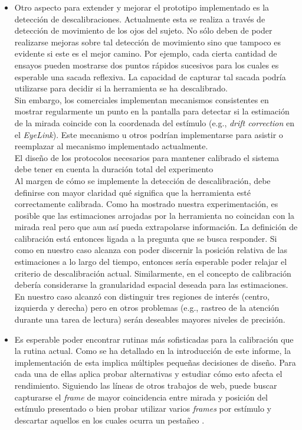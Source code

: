 \begin{itemize}
  \item Otro aspecto para extender y mejorar el prototipo implementado es la
detección de descalibraciones.
  Actualmente esta se realiza a través de detección de movimiento de los ojos
del sujeto.
  No sólo deben de poder realizarse mejoras sobre tal detección de movimiento
sino que tampoco es evidente si este es el mejor camino.
  Por ejemplo, cada cierta cantidad de ensayos pueden mostrarse dos puntos
rápidos sucesivos para los cuales es esperable una sacada reflexiva.
  La capacidad de capturar tal sacada podría utilizarse para decidir si la
herramienta se ha descalibrado. \\
  Sin embargo, los \eyetrackers comerciales implementan mecanismos consistentes
en mostrar regularmente un punto en la pantalla para detectar si la estimación
de la mirada coincide con la coordenada del estímulo (e.g., \textit{drift
correction} en el \eyetracker \textit{EyeLink}).
  Este mecanismo u otros podrían implementarse para asistir o reemplazar al
mecanismo implementado actualmente. \\
  El diseño de los protocolos necesarios para mantener calibrado el sistema
debe tener en cuenta la duración total del experimento \\
  Al margen de cómo se implemente la detección de descalibración, debe
definirse con mayor claridad qué significa que la herramienta esté
correctamente calibrada.
  Como ha mostrado nuestra experimentación, es posible que las estimaciones
arrojadas por la herramienta no coincidan con la mirada real pero que aun así
pueda extrapolarse información.
  La definición de calibración está entonces ligada a la pregunta que se busca
responder.
  Si como en nuestro caso alcanza con poder discernir la posición relativa de
las estimaciones a lo largo del tiempo, entonces sería esperable poder relajar
el criterio de descalibración actual.
  Similarmente, en el concepto de calibración debería considerarse la
granularidad espacial deseada para las estimaciones.
  En nuestro caso alcanzó con distinguir tres regiones de interés (centro,
izquierda y derecha) pero en otros problemas (e.g., rastreo de la atención
durante una tarea de lectura) serán deseables mayores niveles de precisión.

  \item Es esperable poder encontrar rutinas más sofisticadas para la
calibración que la rutina actual.
  Como se ha detallado en la introducción de este informe, la implementación de
esta implica múltiples pequeñas decisiones de diseño.
  Para cada una de ellas aplica probar alternativas y estudiar cómo esto afecta
el rendimiento.
  Siguiendo las líneas de otros trabajos de \eyetracking web, puede buscar
capturarse el \textit{frame} de mayor coincidencia entre mirada y posición del
estímulo presentado \cite{huang_2016_pace} o bien probar utilizar varios
\textit{frames} por estímulo y descartar aquellos en los cuales ocurra un
pestañeo \cite{xu_2015_turker_gaze}. 


\end{itemize}
